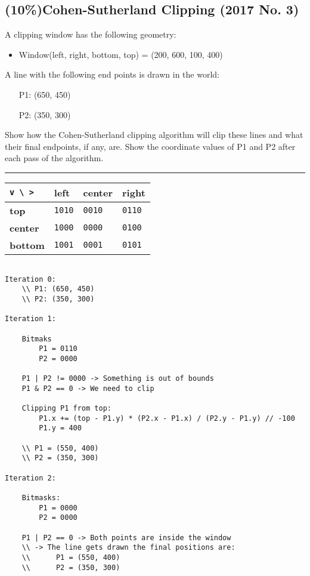 \subsection{(10\%)Cohen-Sutherland Clipping (2017 No. 3)}
A clipping window has the following geometry:
\begin{itemize}
    \item Window(left, right, bottom, top) = (200, 600, 100, 400)
\end{itemize}

A line with the following end points is drawn in the world:
\begin{itemize}
    \item[P1:] (650, 450)
    \item[P2:] (350, 300)
\end{itemize}

Show how the Cohen-Sutherland clipping algorithm will clip these lines and what their final endpoints, if any, are.  Show the coordinate values of P1 and P2 after each pass of the algorithm.

\rule{\textwidth}{0.1mm}

\begin{tabular}{|l|l|l|l|}
    \hline
    \verb|v \ >| & \textbf{left} & \textbf{center} & \textbf{right} \\ \hline
    \textbf{top}    & \verb|1010| & \verb|0010| & \verb|0110| \\ \hline
    \textbf{center} & \verb|1000| & \verb|0000| & \verb|0100| \\ \hline
    \textbf{bottom} & \verb|1001| & \verb|0001| & \verb|0101| \\ \hline
\end{tabular}



\begin{verbatim}

Iteration 0:
    \\ P1: (650, 450)
    \\ P2: (350, 300)

Iteration 1:
    
    Bitmaks
        P1 = 0110
        P2 = 0000
    
    P1 | P2 != 0000 -> Something is out of bounds
    P1 & P2 == 0 -> We need to clip
    
    Clipping P1 from top:
        P1.x += (top - P1.y) * (P2.x - P1.x) / (P2.y - P1.y) // -100
        P1.y = 400
    
    \\ P1 = (550, 400)
    \\ P2 = (350, 300)

Iteration 2:
    
    Bitmasks:
        P1 = 0000
        P2 = 0000

    P1 | P2 == 0 -> Both points are inside the window
    \\ -> The line gets drawn the final positions are:
    \\      P1 = (550, 400)
    \\      P2 = (350, 300)

\end{verbatim}